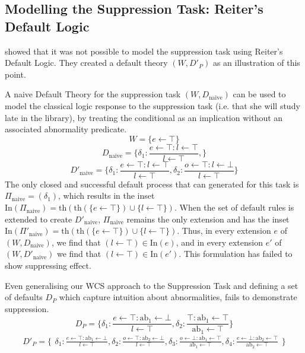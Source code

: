 \subsection{Modelling the Suppression Task: Reiter's Default Logic} \label{ssec:supReit}
\cite{ragni2017formal} showed that it was not possible to model the suppression task using Reiter's Default Logic. They created a default theory $(W, D'_P)$ as an illustration of this point.

A naive Default Theory for the suppression task $(W,D_\text{naive})$ can be used to model the classical logic response to the suppression task (i.e. that she will study late in the library), by treating the conditional as an implication without an associated abnormality predicate.
\[
W=\{e\leftarrow \top\}
\]
\[
D_\text{naive}=\{\delta_1:\frac{e\leftarrow \top:l \leftarrow \top}{l\leftarrow\top} ,
\}
\]
\[
D'_\text{naive}=\{\delta_1:\frac{e\leftarrow \top:l \leftarrow \top}{l\leftarrow\top} ,
\delta_2:\frac{o\leftarrow \top:l \leftarrow \bot}{l\leftarrow\top}
\}
\]
The only closed and successful default process that can generated for this task is $\Pi_\text{naive}=(\delta_1)$, which results in the inset $\text{In}(\Pi_\text{naive})=\text{th}(\text{th}(\{e\leftarrow \top\})\cup\{l \leftarrow \top\})$. When the set of default rules is extended to create $D'_\text{naive}$, $\Pi_\text{naive}$ remains the only extension and has the inset $\text{In}(\Pi'_\text{naive})=\text{th}(\text{th}(\{e\leftarrow \top\})\cup\{l \leftarrow \top\})$. Thus, in every extension $e$ of $(W,D_\text{naive})$, we find that $(l \leftarrow \top)\in \text{In}(e)$, and in every extension $e'$ of $(W,D'_\text{naive})$ we find that $(l \leftarrow \top)\in \text{In}(e')$. This formulation has failed to show suppressing effect.

Even generalising our WCS approach to the Suppression Task and defining a set of defaults $D_P$ which capture intuition about abnormalities, fails to demonstrate suppression.
\[
D_P=\{\delta_1:\frac{e\leftarrow \top:\text{ab}_1 \leftarrow \bot}{l\leftarrow\top} ,
\delta_2:\frac{\top:\text{ab}_1 \leftarrow \top}{\text{ab}_1\leftarrow\top}
\}
\]
\[
D'_P=\{\begin{matrix}\delta_1:\frac{e\leftarrow \top:\text{ab}_1 \leftarrow \bot}{l\leftarrow\top} ,
\delta_2:\frac{o\leftarrow \top:\text{ab}_2 \leftarrow \bot}{l\leftarrow\top},
\delta_3:\frac{o\leftarrow \bot:\text{ab}_1 \leftarrow \top}{\text{ab}_1\leftarrow\top},
\delta_4:\frac{e\leftarrow \bot:\text{ab}_2 \leftarrow \top}{\text{ab}_2\leftarrow\top}
\end{matrix}\}
\]

